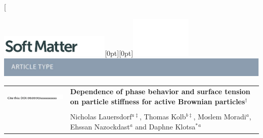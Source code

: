 \documentclass[twoside,twocolumn,9pt]{article}
\begin{document}
\twocolumn[
  \begin{@twocolumnfalse}
{\includegraphics[height=30pt]{SM}\hfill\raisebox{0pt}[0pt][0pt]{\includegraphics[height=55pt]{RSC_LOGO_CMYK}}\\[1ex]
\includegraphics[width=18.5cm]{header_bar}}\par
\vspace{1em}
\sffamily
\begin{tabular}{m{4.5cm} p{13.5cm} }

\includegraphics{DOI} & \noindent\LARGE{\textbf{Dependence of phase behavior and surface tension on particle stiffness for active Brownian particles$^\dag$}} \\%
\vspace{0.3cm} & \vspace{0.3cm} \\

 & \noindent\large{Nicholas Lauersdorf\textit{$^{a\ddagger}$}, Thomas Kolb\textit{$^{b\ddagger}$},
 Moslem Moradi\textit{$^{a}$}, 
 Ehssan Nazockdast\textit{$^{a}$} 
 and Daphne Klotsa$^{\ast}$\textit{$^{a}$}}\\%


\end{tabular}
\end{@twocolumnfalse}
\end{document}

